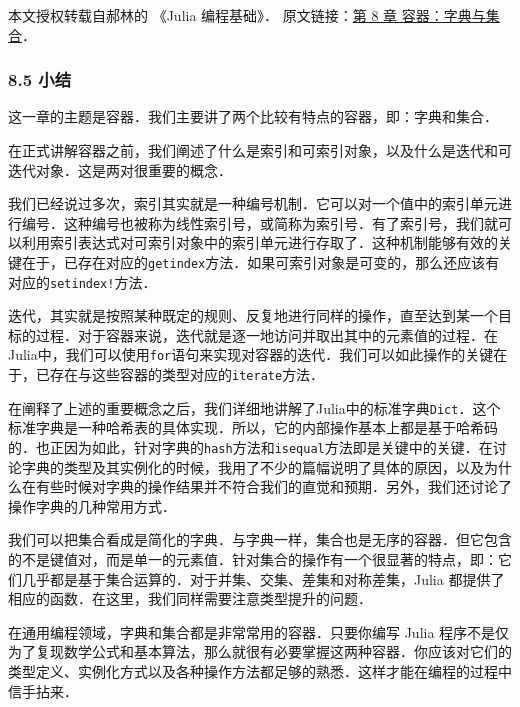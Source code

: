 
本文授权转载自郝林的 《Julia 编程基础》． 原文链接：\href{https://github.com/hyper0x/JuliaBasics/blob/master/book/ch08.md}{第 8 章 容器：字典与集合}．


\subsubsection{8.5 小结}

这一章的主题是容器．我们主要讲了两个比较有特点的容器，即：字典和集合．

在正式讲解容器之前，我们阐述了什么是索引和可索引对象，以及什么是迭代和可迭代对象．这是两对很重要的概念．

我们已经说过多次，索引其实就是一种编号机制．它可以对一个值中的索引单元进行编号．这种编号也被称为线性索引号，或简称为索引号．有了索引号，我们就可以利用索引表达式对可索引对象中的索引单元进行存取了．这种机制能够有效的关键在于，已存在对应的\verb|getindex|方法．如果可索引对象是可变的，那么还应该有对应的\verb|setindex!|方法．

迭代，其实就是按照某种既定的规则、反复地进行同样的操作，直至达到某一个目标的过程．对于容器来说，迭代就是逐一地访问并取出其中的元素值的过程．在Julia中，我们可以使用\verb|for|语句来实现对容器的迭代．我们可以如此操作的关键在于，已存在与这些容器的类型对应的\verb|iterate|方法．

在阐释了上述的重要概念之后，我们详细地讲解了Julia中的标准字典\verb|Dict|．这个标准字典是一种哈希表的具体实现．所以，它的内部操作基本上都是基于哈希码的．也正因为如此，针对字典的\verb|hash|方法和\verb|isequal|方法即是关键中的关键．在讨论字典的类型及其实例化的时候，我用了不少的篇幅说明了具体的原因，以及为什么在有些时候对字典的操作结果并不符合我们的直觉和预期．另外，我们还讨论了操作字典的几种常用方式．

我们可以把集合看成是简化的字典．与字典一样，集合也是无序的容器．但它包含的不是键值对，而是单一的元素值．针对集合的操作有一个很显著的特点，即：它们几乎都是基于集合运算的．对于并集、交集、差集和对称差集，Julia 都提供了相应的函数．在这里，我们同样需要注意类型提升的问题．

在通用编程领域，字典和集合都是非常常用的容器．只要你编写 Julia 程序不是仅为了复现数学公式和基本算法，那么就很有必要掌握这两种容器．你应该对它们的类型定义、实例化方式以及各种操作方法都足够的熟悉．这样才能在编程的过程中信手拈来．